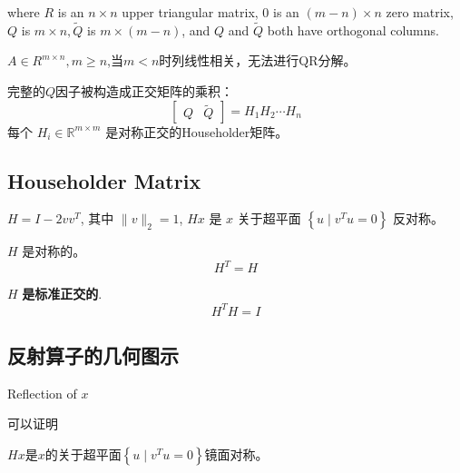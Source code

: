 where $ R $ is an $ n \times n $ upper triangular matrix, $0$ is an $ (m-n) \times n $ zero matrix, $ Q  $ is $ m \times n,\tilde{Q} $ is $ m \times(m-n) $, and $ Q $ and $ \tilde{Q} $ both have orthogonal columns. 

\begin{remark}
    $A \in R^{m \times n}, m \ge n$,当$m < n$时列线性相关，无法进行QR分解。
\end{remark}



完整的$Q$因子被构造成正交矩阵的乘积：
\begin{equation}
\left[\begin{array}{ll}
Q & \tilde{Q}
\end{array}\right]=H_{1} H_{2} \cdots H_{n}
\end{equation}
每个 $ H_{i} \in \mathbb{R}^{m \times m} $ 是对称正交的Householder矩阵。



\subsection{Householder Matrix}

\begin{theorem}
    $ H=I-2 v v^{T} $, 其中 $ \|v\|_{2}=1 $, $ H x $ 是 $ x $ 关于超平面 $ \left\{u \mid v^{T} u=0\right\} $ 反对称。
\end{theorem}

\begin{theorem}
    $ H $ 是对称的。
    \begin{equation} H^{T}=H \end{equation}
\end{theorem}
    
\begin{theorem}
    $ H $ \textbf{是标准正交的}.
\begin{equation} H^{T} H=I \end{equation}
\end{theorem}

\subsection{反射算子的几何图示}
\begin{FigureCenter}{Reflection of $x$}
    
\end{FigureCenter}

可以证明

\begin{theorem}
    $Hx$是$x$的关于超平面$ \left\{u \mid v^{T} u=0\right\} $镜面对称。
\end{theorem}



